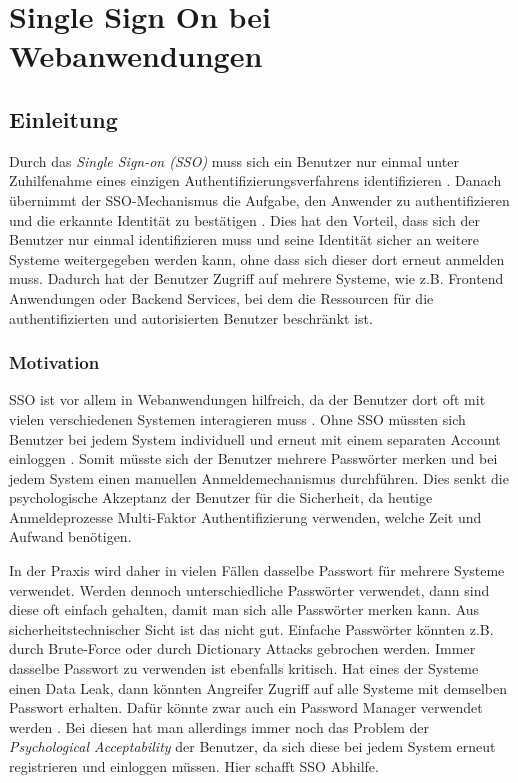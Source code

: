 
\chapter{Single Sign On bei Webanwendungen}

\section{Einleitung} \label{EB_Einleitung}

Durch das \textit{Single Sign-on (SSO)} muss sich ein Benutzer nur einmal unter Zuhilfenahme eines einzigen Authentifizierungsverfahrens identifizieren \cite{EB52}. Danach übernimmt der SSO-Mechanismus die Aufgabe, den Anwender zu authentifizieren und die erkannte Identität zu bestätigen \cite{EB52}. Dies hat den Vorteil, dass sich der Benutzer nur einmal identifizieren muss und seine Identität sicher an weitere Systeme weitergegeben werden kann, ohne dass sich dieser dort erneut anmelden muss. Dadurch hat der Benutzer Zugriff auf mehrere Systeme, wie z.B. Frontend Anwendungen oder Backend Services, bei dem die Ressourcen für die authentifizierten und autorisierten Benutzer beschränkt ist.

\subsection{Motivation}


SSO ist vor allem in Webanwendungen hilfreich, da der Benutzer dort oft mit vielen verschiedenen Systemen interagieren muss \cite{EB34}. Ohne SSO müssten sich Benutzer bei jedem System individuell und erneut mit einem separaten Account einloggen \cite{EB34}. Somit müsste sich der Benutzer mehrere Passwörter merken und bei jedem System einen manuellen Anmeldemechanismus durchführen. Dies senkt die psychologische Akzeptanz der Benutzer für die Sicherheit, da heutige Anmeldeprozesse Multi-Faktor Authentifizierung verwenden, welche Zeit und Aufwand benötigen.

In der Praxis wird daher in vielen Fällen dasselbe Passwort für mehrere Systeme verwendet. Werden dennoch unterschiedliche Passwörter verwendet, dann sind diese oft einfach gehalten, damit man sich alle Passwörter merken kann. Aus sicherheitstechnischer Sicht ist das nicht gut. Einfache Passwörter könnten z.B. durch Brute-Force oder durch Dictionary Attacks gebrochen werden. Immer dasselbe Passwort zu verwenden ist ebenfalls kritisch. Hat eines der Systeme einen Data Leak, dann könnten Angreifer Zugriff auf alle Systeme mit demselben Passwort erhalten. Dafür könnte zwar auch ein Password Manager verwendet werden \cite{EB34}. Bei diesen hat man allerdings immer noch das Problem der \textit{Psychological Acceptability} der Benutzer, da sich diese bei jedem System erneut registrieren und einloggen müssen. Hier schafft SSO Abhilfe.

